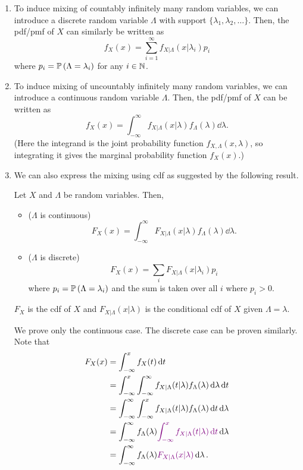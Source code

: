 \begin{enumerate}
\item \label{it:mixing-count-infinite}
To induce mixing of countably infinitely many random variables, we can
introduce a discrete random variable \(\Lambda\) with support
\(\{\lambda_1,\lambda_2,\dotsc\}\). Then, the pdf/pmf of \(X\) can similarly be
written as
\[
f_X(x)=\boxed{\sum_{i=1}^{\infty}f_{X|\Lambda}(x|\lambda_i)p_i}
\]
where \(p_i=\mathbb{P}\left(\Lambda=\lambda_i\right)\) for any \(i\in\mathbb{N}\).

\item \label{it:mixing-uncount-infinite}
To induce mixing of uncountably infinitely many random variables, we can
introduce a continuous random variable \(\Lambda\). Then, the pdf/pmf of \(X\)
can be written as
\[
f_X(x)=\boxed{\int_{-\infty}^{\infty}f_{X|\Lambda}(x|\lambda)f_{\Lambda}(\lambda)\dd{\lambda}}.
\]
(Here the integrand is the joint probability function
\(f_{X,\Lambda}(x,\lambda)\), so integrating it gives the marginal probability
function \(f_X(x)\).)

\item We can also express the mixing using cdf as suggested by the following
result.
\begin{proposition}
\label{prp:mixing-cdf}
Let \(X\) and \(\Lambda\) be random variables. Then,
\begin{itemize}
\item (\(\Lambda\) is continuous)
\[
F_X(x)=\int_{-\infty}^{\infty}F_{X|\Lambda}(x|\lambda)f_{\Lambda}(\lambda)\dd{\lambda}.
\]
\item (\(\Lambda\) is discrete)
\[
F_X(x)=\sum_{i}^{}F_{X|\Lambda}(x|\lambda_i)p_i
\]
where \(p_i=\mathbb{P}\left(\Lambda=\lambda_i\right)\) and the sum is taken over all \(i\)
where \(p_i>0\).
\end{itemize}
\begin{note}
\(F_X\) is the cdf of \(X\) and \(F_{X|\Lambda}(x|\lambda)\) is the conditional
cdf of \(X\) given \(\Lambda=\lambda\).
\end{note}
\end{proposition}
\begin{pf}
We prove only the continuous case. The discrete case can be proven similarly.
Note that
\begin{align*}
F_X(x)&=\int_{-\infty}^{x}f_X(t)\dd{t}\\
&=\int_{-\infty}^{x}\int_{-\infty}^{\infty}
f_{X|\Lambda}(t|\lambda)f_{\Lambda}(\lambda)\dd{\lambda}\dd{t}\\
&=\int_{-\infty}^{\infty}\int_{-\infty}^{x}
f_{X|\Lambda}(t|\lambda)f_{\Lambda}(\lambda)\dd{t}\dd{\lambda}\\
&=\int_{-\infty}^{\infty}f_{\Lambda}(\lambda){\color{violet}\int_{-\infty}^{x}
f_{X|\Lambda}(t|\lambda)\dd{t}}\dd{\lambda}\\
&=\int_{-\infty}^{\infty}f_{\Lambda}(\lambda){\color{violet}F_{X|\Lambda}(x|\lambda)}\dd{\lambda}.
\end{align*}

\end{pf}
\end{enumerate}
